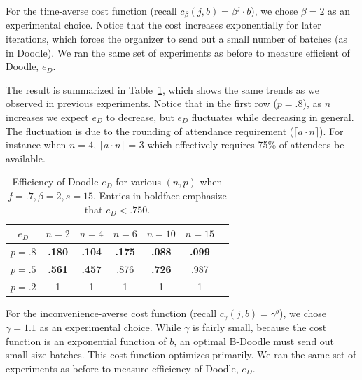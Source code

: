 For the time-averse cost function (recall $c_{\beta}(j, b) = \beta^j \cdot b$), we chose $\beta = 2$ as an experimental choice. Notice that the cost increases exponentially for later iterations, which forces the organizer to send out a small number of batches (as in Doodle). We ran the same set of experiments as before to measure efficient of Doodle, $e_{D}$.

The result is summarized in Table~\ref{bdoodle:table:DoodleEfficiency-lower-attendance_time_averse}, which shows the same trends as we observed in previous experiments. Notice that in the first row ($p = .8$), as $n$ increases we expect $e_{D}$ to decrease, but $e_{D}$ fluctuates while decreasing in general. The fluctuation is due to the rounding of attendance requirement ($\lceil a \cdot n \rceil$). For instance when $n = 4$, $\lceil a \cdot n \rceil$ = 3 which effectively requires 75\% of attendees be available.
\begin{table}[h]  %
\centering
\begin{tabular}{|c|c|c|c|c|c|c|}
	\hline
	$e_{D}$ & $n = 2$ & $n = 4$ & $n = 6$ & $ n = 10 $ & $n = 15$ \\ \hline
	$p = .8$ & \textbf{.180} & \textbf{.104} & \textbf{.175} & \textbf{.088} & \textbf{.099} \\ \hline
	$p = .5$ & \textbf{.561} & \textbf{.457} & .876 & \textbf{.726} & .987  \\ \hline
	$p = .2$ & 1 & 1 & 1 & 1 & 1\\ \hline
\end{tabular}
\caption{Efficiency of Doodle $e_{D}$ for various $(n, p)$ when $f = .7, \beta=2, s = 15$.
Entries in boldface emphasize that $e_{D} < .750$.
} \label{bdoodle:table:DoodleEfficiency-lower-attendance_time_averse}
\end{table}

For the inconvenience-averse cost function (recall $c_{\gamma}(j, b) = \gamma^{b}$), we chose $\gamma = 1.1$ as an experimental choice. While $\gamma$ is fairly small, because the cost function is an exponential function of $b$, an optimal B-Doodle must send out small-size batches. This cost function optimizes \Inconveniences primarily. We ran the same set of experiments as before to measure efficiency of Doodle, $e_{D}$.

